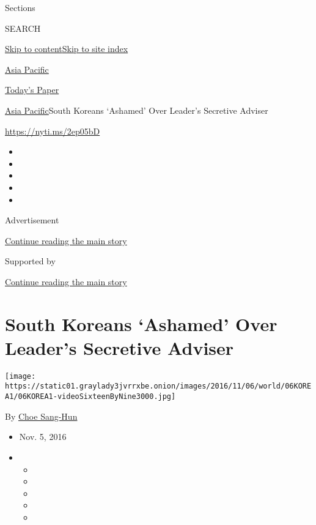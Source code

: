 Sections

SEARCH

\protect\hyperlink{site-content}{Skip to
content}\protect\hyperlink{site-index}{Skip to site index}

\href{https://www.nytimes3xbfgragh.onion/section/world/asia}{Asia
Pacific}

\href{https://myaccount.nytimes3xbfgragh.onion/auth/login?response_type=cookie\&client_id=vi}{}

\href{https://www.nytimes3xbfgragh.onion/section/todayspaper}{Today's
Paper}

\href{/section/world/asia}{Asia Pacific}\textbar{}South Koreans
`Ashamed' Over Leader's Secretive Adviser

\url{https://nyti.ms/2ep05bD}

\begin{itemize}
\item
\item
\item
\item
\item
\end{itemize}

Advertisement

\protect\hyperlink{after-top}{Continue reading the main story}

Supported by

\protect\hyperlink{after-sponsor}{Continue reading the main story}

\hypertarget{south-koreans-ashamed-over-leaders-secretive-adviser}{%
\section{South Koreans `Ashamed' Over Leader's Secretive
Adviser}\label{south-koreans-ashamed-over-leaders-secretive-adviser}}

\texttt{[image: https://static01.graylady3jvrrxbe.onion/images/2016/11/06/world/06KOREA1/06KOREA1-videoSixteenByNine3000.jpg]}

By \href{http://www.nytimes3xbfgragh.onion/by/choe-sang-hun}{Choe
Sang-Hun}

\begin{itemize}
\item
  Nov. 5, 2016
\item
  \begin{itemize}
  \item
  \item
  \item
  \item
  \item
  \end{itemize}
\end{itemize}

